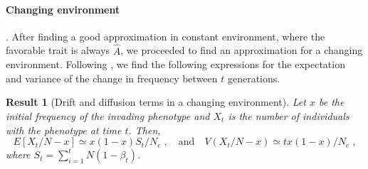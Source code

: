 \documentclass[12pt]{extarticle}
\newtheorem{result}{Result}
\begin{document}
\paragraph*{Changing environment}. After finding a good approximation in constant environment, where the favorable trait is always $\hat{A}$, we proceeded to find an approximation for a changing environment. 
Following \citet{changeEnv}, we find the following expressions for the expectation and variance of the change in frequency between $t$ generations.\\

\begin{result} [Drift and diffusion terms in a changing environment]\label{res:ch_expected}
Let $x$ be the initial frequency of the invading phenotype and $X_t$ is the number of individuals with the phenotype at time $t$.
Then,
\begin{equation}\label{eq:ch_expected_and_var}
E[X_t/N - x] \simeq x(1-x) S_t / N_e \;, 
\quad
\text{and}
\quad
V(X_t/N-x) \simeq  t x(1-x) / N_e \;,
\end{equation}
where $S_t=\sum\limits_{i=1}^{t} N (1-\beta_t)$.
\end{result}
\end{document}

